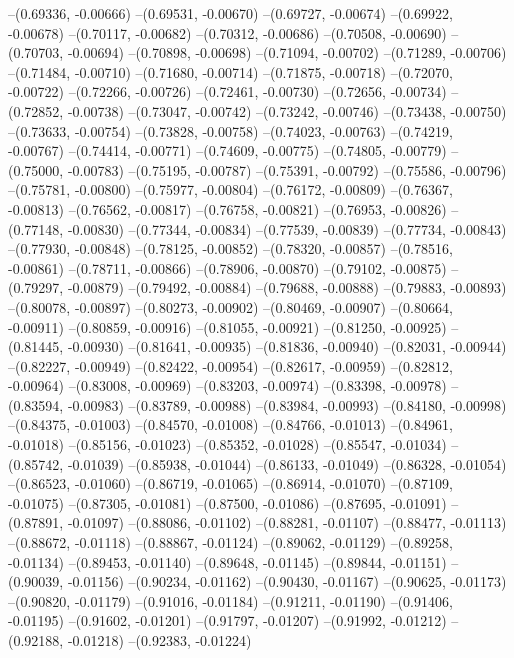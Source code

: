 --(0.69336, -0.00666)
--(0.69531, -0.00670)
--(0.69727, -0.00674)
--(0.69922, -0.00678)
--(0.70117, -0.00682)
--(0.70312, -0.00686)
--(0.70508, -0.00690)
--(0.70703, -0.00694)
--(0.70898, -0.00698)
--(0.71094, -0.00702)
--(0.71289, -0.00706)
--(0.71484, -0.00710)
--(0.71680, -0.00714)
--(0.71875, -0.00718)
--(0.72070, -0.00722)
--(0.72266, -0.00726)
--(0.72461, -0.00730)
--(0.72656, -0.00734)
--(0.72852, -0.00738)
--(0.73047, -0.00742)
--(0.73242, -0.00746)
--(0.73438, -0.00750)
--(0.73633, -0.00754)
--(0.73828, -0.00758)
--(0.74023, -0.00763)
--(0.74219, -0.00767)
--(0.74414, -0.00771)
--(0.74609, -0.00775)
--(0.74805, -0.00779)
--(0.75000, -0.00783)
--(0.75195, -0.00787)
--(0.75391, -0.00792)
--(0.75586, -0.00796)
--(0.75781, -0.00800)
--(0.75977, -0.00804)
--(0.76172, -0.00809)
--(0.76367, -0.00813)
--(0.76562, -0.00817)
--(0.76758, -0.00821)
--(0.76953, -0.00826)
--(0.77148, -0.00830)
--(0.77344, -0.00834)
--(0.77539, -0.00839)
--(0.77734, -0.00843)
--(0.77930, -0.00848)
--(0.78125, -0.00852)
--(0.78320, -0.00857)
--(0.78516, -0.00861)
--(0.78711, -0.00866)
--(0.78906, -0.00870)
--(0.79102, -0.00875)
--(0.79297, -0.00879)
--(0.79492, -0.00884)
--(0.79688, -0.00888)
--(0.79883, -0.00893)
--(0.80078, -0.00897)
--(0.80273, -0.00902)
--(0.80469, -0.00907)
--(0.80664, -0.00911)
--(0.80859, -0.00916)
--(0.81055, -0.00921)
--(0.81250, -0.00925)
--(0.81445, -0.00930)
--(0.81641, -0.00935)
--(0.81836, -0.00940)
--(0.82031, -0.00944)
--(0.82227, -0.00949)
--(0.82422, -0.00954)
--(0.82617, -0.00959)
--(0.82812, -0.00964)
--(0.83008, -0.00969)
--(0.83203, -0.00974)
--(0.83398, -0.00978)
--(0.83594, -0.00983)
--(0.83789, -0.00988)
--(0.83984, -0.00993)
--(0.84180, -0.00998)
--(0.84375, -0.01003)
--(0.84570, -0.01008)
--(0.84766, -0.01013)
--(0.84961, -0.01018)
--(0.85156, -0.01023)
--(0.85352, -0.01028)
--(0.85547, -0.01034)
--(0.85742, -0.01039)
--(0.85938, -0.01044)
--(0.86133, -0.01049)
--(0.86328, -0.01054)
--(0.86523, -0.01060)
--(0.86719, -0.01065)
--(0.86914, -0.01070)
--(0.87109, -0.01075)
--(0.87305, -0.01081)
--(0.87500, -0.01086)
--(0.87695, -0.01091)
--(0.87891, -0.01097)
--(0.88086, -0.01102)
--(0.88281, -0.01107)
--(0.88477, -0.01113)
--(0.88672, -0.01118)
--(0.88867, -0.01124)
--(0.89062, -0.01129)
--(0.89258, -0.01134)
--(0.89453, -0.01140)
--(0.89648, -0.01145)
--(0.89844, -0.01151)
--(0.90039, -0.01156)
--(0.90234, -0.01162)
--(0.90430, -0.01167)
--(0.90625, -0.01173)
--(0.90820, -0.01179)
--(0.91016, -0.01184)
--(0.91211, -0.01190)
--(0.91406, -0.01195)
--(0.91602, -0.01201)
--(0.91797, -0.01207)
--(0.91992, -0.01212)
--(0.92188, -0.01218)
--(0.92383, -0.01224)
